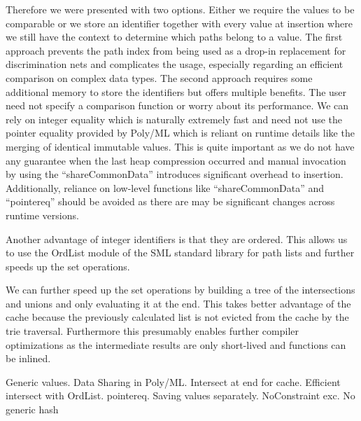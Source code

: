 Therefore we were presented with two options. Either we require the values to be comparable or we store an identifier together with every value at insertion where we still have the context to determine which paths belong to a value. The first approach prevents the path index from being used as a drop-in replacement for discrimination nets and complicates the usage, especially regarding an efficient comparison on complex data types. The second approach requires some additional memory to store the identifiers but offers multiple benefits. The user need not specify a comparison function or worry about its performance. We can rely on integer equality which is naturally extremely fast and need not use the pointer equality provided by Poly/ML which is reliant on runtime details like the merging of identical immutable values. This is quite important as we do not have any guarantee when the last heap compression occurred and manual invocation by using the ``shareCommonData'' introduces significant overhead to insertion. Additionally, reliance on low-level functions like ``shareCommonData'' and ``pointereq'' should be avoided as there are may be significant changes across runtime versions.

Another advantage of integer identifiers is that they are ordered. This allows us to use the OrdList module of the SML standard library for path lists and further speeds up the set operations.

We can further speed up the set operations by building a tree of the intersections and unions and only evaluating it at the end. This takes better advantage of the cache because the previously calculated list is not evicted from the cache by the trie traversal. Furthermore this presumably enables further compiler optimizations as the intermediate results are only short-lived and functions can be inlined.

Generic values.
Data Sharing in Poly/ML. Intersect at end for cache. Efficient intersect with OrdList. pointereq. Saving values separately. NoConstraint exc. No generic hash

